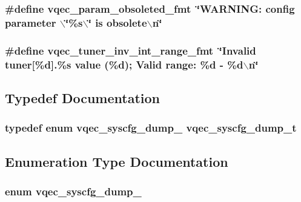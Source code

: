 \subsubsection{\setlength{\rightskip}{0pt plus 5cm}\#define vqec\_\-param\_\-obsoleted\_\-fmt~\char`\"{}WARNING: config parameter $\backslash$\char`\"{}\%s$\backslash$\char`\"{} is obsolete$\backslash$n\char`\"{}}\label{vqec__syscfg_8c_ad1977c2cbfe819e50b3c2841bbb54a2}


\subsubsection{\setlength{\rightskip}{0pt plus 5cm}\#define vqec\_\-tuner\_\-inv\_\-int\_\-range\_\-fmt~\char`\"{}Invalid tuner[\%d].\%s value (\%d); Valid range: \%d - \%d$\backslash$n\char`\"{}}\label{vqec__syscfg_8c_f1414ff74e89acb962d1c24c5cd06dbd}




\subsection{Typedef Documentation}
\subsubsection{\setlength{\rightskip}{0pt plus 5cm}typedef enum \bf{vqec\_\-syscfg\_\-dump\_\-}  \bf{vqec\_\-syscfg\_\-dump\_\-t}}\label{vqec__syscfg_8c_100974bdf8899add6cef07e4fc8eb663}




\subsection{Enumeration Type Documentation}
\subsubsection{\setlength{\rightskip}{0pt plus 5cm}enum \bf{vqec\_\-syscfg\_\-dump\_\-}}\label{vqec__syscfg_8c_0f2f4343650a5fdb713ce633bf1770cb}


